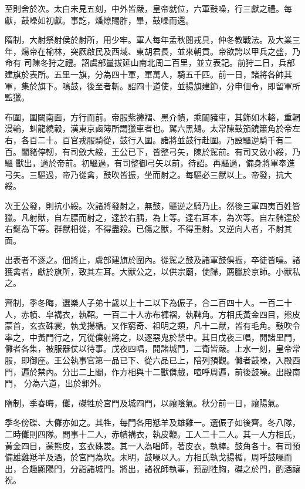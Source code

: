 \begin{pinyinscope}
 至則舍於次。太白未見五刻，中外皆嚴，皇帝就位，六軍鼓噪，行三獻之禮。每獻，鼓噪如初獻。事訖，燔燎賜胙，畢，鼓噪而還。



 隋制，大射祭射侯於射所，用少牢。軍人每年孟秋閱戎具，仲冬教戰法。及大業三年，煬帝在榆林，突厥啟民及西域、東胡君長，並來朝貢。帝欲誇以甲兵之盛，乃命有
 司陳冬狩之禮。詔虞部量拔延山南北周二百里，並立表記。前狩二日，兵部建旗於表所。五里一旗，分為四十軍，軍萬人，騎五千匹。前一日，諸將各帥其軍，集於旗下。鳴鼓，後至者斬。詔四十道使，並揚旗建節，分申佃令，即留軍所監獵。



 布圍，圍闕南面，方行而前。帝服紫褲褶、黑介幘，乘闟豬車，其飾如木輅，重輞漫輪，虯龍繞轂，漢東京鹵簿所謂獵車者也。駕六黑鳷。太常陳鼓笳鐃簫角於帝左右，各百二十。百官戎服騎從，鼓行入圍。諸將並鼓行赴圍。乃設驅逆騎千有二百。闟豬停軔，有司斂大綏，王公已下，皆整弓矢，陳於駕前。有司又斂小綏，乃驅
 獸出，過於帝前。初驅過，有司整御弓矢以前，待詔。再驅過，備身將軍奉進弓矢。三驅過，帝乃從禽，鼓吹皆振，坐而射之。每驅必三獸以上。帝發，抗大綏。



 次王公發，則抗小綏。次諸將發射之，無鼓，驅逆之騎乃止。然後三軍四夷百姓皆獵。凡射獸，自左膘而射之，達於右腢，為上等。達右耳本，為次等。自左髀達於右鋋為下等。群獸相從，不得盡殺。已傷之獸，不得重射。又逆向人者，不射其面。



 出表者不逐之。佃將止，虞部建旗於圍內。從駕之鼓及諸軍鼓俱振，卒徒皆噪。諸獲禽者，獻於旗所，致其左耳。大獸公之，以供宗廟，使歸，薦臘於京師。小獸私之。



 齊制，季冬晦，選樂人子弟十歲以上十二以下為侲子，合二百四十人。一百二十人，赤幘、皁褠衣，執鞀。一百二十人赤布褲褶，執鞞角。方相氏黃金四目，熊皮蒙首，玄衣硃裳，執戈揚楯。又作窮奇、祖明之類，凡十二獸，皆有毛角。鼓吹令率之，中黃門行之，冗從僕射將之，以逐惡鬼於禁中。其日戊夜三唱，開諸里門，儺者各集，被服器仗以待事。戊夜四唱，開諸城門，二衛皆嚴。上水一刻，皇帝常服，即御座。王公執事官第一品已下、從六品已上，陪列預觀。儺者鼓噪，入殿西門，遍於禁內。分出二上閣，作方相與十二獸儛戲，喧呼周遍，前後鼓噪。出殿南門，
 分為六道，出於郭外。



 隋制，季春晦，儺，磔牲於宮門及城四門，以禳陰氣。秋分前一日，禳陽氣。



 季冬傍磔、大儺亦如之。其牲，每門各用羝羊及雄雞一。選侲子如後齊。冬八隊，二時儺則四隊。問事十二人，赤幘褠衣，執皮鞭。工人二十二人。其一人方相氏，黃金四目，蒙熊皮，玄衣硃裳。其一人為唱師，著皮衣，執棒。鼓角各十。有司預備雄雞羝羊及酒，於宮門為坎。未明，鼓噪以入。方相氏執戈揚楯，周呼鼓噪而出，合趣顯陽門，分詣諸城門。將出，諸祝師執事，預副牲胸，磔之於門，酌酒禳祝。




\end{pinyinscope}
